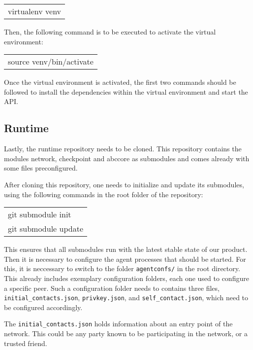 \vspace{2mm}
\begin{tabular}{l}
	virtualenv venv
\end{tabular}
\vspace{2mm}

Then, the following command is to be executed to activate the virtual environment: 

\vspace{2mm}
\begin{tabular}{l}
	source venv/bin/activate
\end{tabular}
\vspace{2mm}

Once the virtual environment is activated, the first two commands should be followed to install the dependencies within the virtual environment and start the API. 


\subsection*{Runtime}
Lastly, the runtime repository needs to be cloned. This repository contains the modules network, checkpoint and abccore as submodules and comes already with some files preconfigured.

After cloning this repository, one needs to initialize and update its submodules, using the following commands in the root folder of the repository:

\vspace{2mm}
\begin{tabular}{l}
	git submodule init \\ 
	git submodule update \\
\end{tabular}

\vspace{2mm}


This ensures that all submodules run with the latest stable state of our product. Then it is necessary to configure the agent processes that should be started. For this, it is neccessary to switch to the folder \texttt{agentconfs/} in the root directory. This already includes exemplary configuration folders, each one used to configure a specific peer. Such a configuration folder needs to contains three files, \texttt{initial\_contacts.json}, \texttt{privkey.json}, and \texttt{self\_contact.json}, which need to be configured accordingly.

The \texttt{initial\_contacts.json} holds information about an entry point of the network. This could be any party known to be participating in the network, or a trusted friend. 

